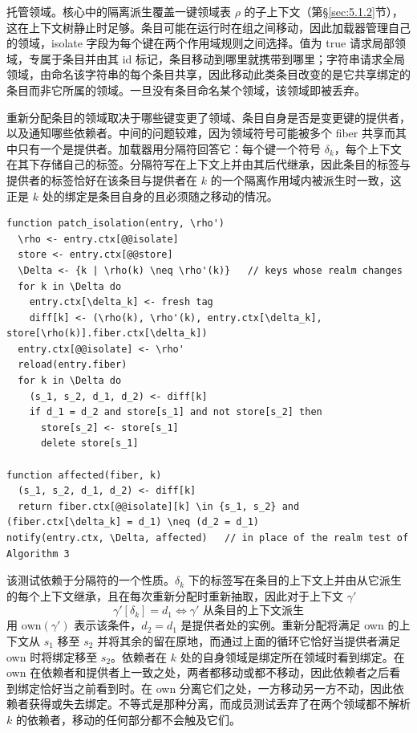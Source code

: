 托管领域。核心中的隔离派生覆盖一键领域表 $\rho$ 的子上下文（第\S\ref{sec:5.1.2}节），这在上下文树静止时足够。条目可能在运行时在组之间移动，因此加载器管理自己的领域，isolate 字段为每个键在两个作用域规则之间选择。值为 true 请求局部领域，专属于条目并由其 id 标记，条目移动到哪里就携带到哪里；字符串请求全局领域，由命名该字符串的每个条目共享，因此移动此类条目改变的是它共享绑定的条目而非它所属的领域。一旦没有条目命名某个领域，该领域即被丢弃。

重新分配条目的领域取决于哪些键变更了领域、条目自身是否是变更键的提供者，以及通知哪些依赖者。中间的问题较难，因为领域符号可能被多个 fiber 共享而其中只有一个是提供者。加载器用分隔符回答它：每个键一个符号 $\delta_k$，每个上下文在其下存储自己的标签。分隔符写在上下文上并由其后代继承，因此条目的标签与提供者的标签恰好在该条目与提供者在 $k$ 的一个隔离作用域内被派生时一致，这正是 $k$ 处的绑定是条目自身的且必须随之移动的情况。

\begin{lstlisting}[caption={隔离领域重新分配}]
function patch_isolation(entry, \rho')
  \rho <- entry.ctx[@@isolate]
  store <- entry.ctx[@@store]
  \Delta <- {k | \rho(k) \neq \rho'(k)}   // keys whose realm changes
  for k in \Delta do
    entry.ctx[\delta_k] <- fresh tag
    diff[k] <- (\rho(k), \rho'(k), entry.ctx[\delta_k], store[\rho(k)].fiber.ctx[\delta_k])
  entry.ctx[@@isolate] <- \rho'
  reload(entry.fiber)
  for k in \Delta do
    (s_1, s_2, d_1, d_2) <- diff[k]
    if d_1 = d_2 and store[s_1] and not store[s_2] then
      store[s_2] <- store[s_1]
      delete store[s_1]

function affected(fiber, k)
  (s_1, s_2, d_1, d_2) <- diff[k]
  return fiber.ctx[@@isolate][k] \in {s_1, s_2} and (fiber.ctx[\delta_k] = d_1) \neq (d_2 = d_1)
notify(entry.ctx, \Delta, affected)   // in place of the realm test of Algorithm 3
\end{lstlisting}

该测试依赖于分隔符的一个性质。$\delta_k$ 下的标签写在条目的上下文上并由从它派生的每个上下文继承，且在每次重新分配时重新抽取，因此对于上下文 $\gamma'$
\begin{equation}\label{eq:5.1}
\gamma'[\delta_k] = d_1 \iff \gamma' \mbox{ 从条目的上下文派生}
\end{equation}
用 $\mathrm{own}(\gamma')$ 表示该条件，$d_2 = d_1$ 是提供者处的实例。重新分配将满足 own 的上下文从 $s_1$ 移至 $s_2$ 并将其余的留在原地，而通过上面的循环它恰好当提供者满足 own 时将绑定移至 $s_2$。依赖者在 $k$ 处的自身领域是绑定所在领域时看到绑定。在 own 在依赖者和提供者上一致之处，两者都移动或都不移动，因此依赖者之后看到绑定恰好当之前看到时。在 own 分离它们之处，一方移动另一方不动，因此依赖者获得或失去绑定。不等式是那种分离，而成员测试丢弃了在两个领域都不解析 $k$ 的依赖者，移动的任何部分都不会触及它们。

